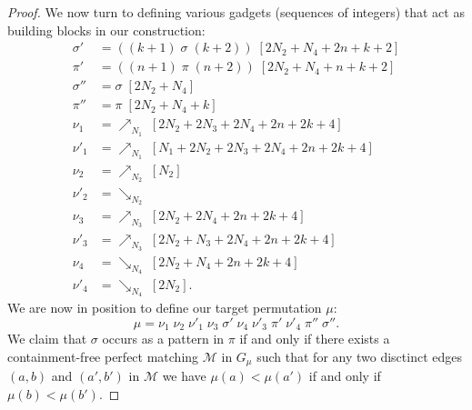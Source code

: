 \documentclass[a4paper]{llncs}
\begin{document}
\begin{proof}
  We now turn to defining various gadgets (sequences of integers)
  that act as building blocks in our construction:
  \begin{align*}
  \sigma'  &= ((k+1) \; \sigma \; (k+2)) \; [2N_2 + N_4 + 2n + k + 2] \\
  \pi'     &= ((n+1) \; \pi \; (n+2)) \; [2N_2 + N_4 + n + k + 2] \\
  \sigma'' &= \sigma \; [2N_2 + N_4] \\
  \pi''    &= \pi \; [2N_2 + N_4 + k] \\
  \nu_1    &= \nearrow_{N_1} \; [2N_2 + 2N_3 + 2N_4 + 2n + 2k + 4] \\
  \nu'_1   &= \nearrow_{N_1} \; [N_1 + 2N_2 + 2N_3 + 2N_4 + 2n + 2k + 4] \\
  \nu_2    &= \nearrow_{N_2} \; [N_2] \\
  \nu'_2   &= \searrow_{N_2} \\
  \nu_3    &= \nearrow_{N_3} \; [2N_2 + 2N_4 + 2n + 2k + 4] \\
  \nu'_3   &= \nearrow_{N_3} \; [2N_2 + N_3 + 2N_4 + 2n + 2k + 4] \\
  \nu_4    &= \searrow_{N_4} \; [2N_2 + N_4 + 2n + 2k + 4] \\
  \nu'_4   &= \searrow_{N_4} \; [2N_2]\text{.}
  \end{align*}
  We are now in position to define our target permutation $\mu$:
  $$
  \mu
  =
  \nu_1 \; \nu_2 \; \nu'_1 \; \nu_3 \; \sigma' \; \nu_4 \; \nu'_3 \; \pi' \; \nu'_4 \; \pi'' \; \sigma''
  \text{.}
  $$
  We claim that $\sigma$ occurs as a pattern in $\pi$ if and only if
  there exists a containment-free perfect matching
  $\mathcal{M}$ in $G_\mu$ such that
  for any two disctinct edges
  $(a, b)$ and $(a', b')$ in $\mathcal{M}$
  we have $\mu(a) < \mu(a')$ if and only if $\mu(b) < \mu(b')$.


\end{proof}
\end{document}
